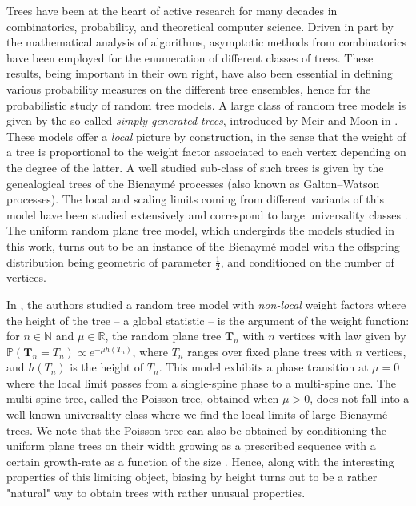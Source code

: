 \documentclass{article}
\newcommand{\pr}{\mathbb{P}}								%
\newcommand{\1}{\mathbbm{1}}								%
\theoremstyle{definition}
\numberwithin{equation}{section}
\newcommand{\bT}{\mathbf T}
\newcommand{\N}{\mathbb N}
\newcommand{\R}{\mathbb R}
\begin{document}
Trees have been at the heart of active research for many decades in combinatorics, probability, and theoretical computer science.  Driven in part by the mathematical analysis of algorithms, asymptotic methods from combinatorics have been employed for the enumeration of different classes of trees. These results, being important in their own right, have also been essential in defining various probability measures on the different tree ensembles, hence for the probabilistic study of random tree models. 
A large class of random tree models is given by the so-called \emph{simply generated trees}, introduced by Meir and Moon in \cite{meir1978altitude}. These models offer a \emph{local} picture by construction, in the sense that the weight of a tree is proportional to the weight factor associated to each vertex depending on the degree of the latter. A well studied sub-class of such trees is given by the genealogical trees of the Bienaym\'e processes (also known as Galton--Watson processes). The local and scaling limits coming from different variants of this model have been studied extensively and correspond to large universality classes \cite{abraham2015introduction,gall2011scaling}. The uniform random plane tree model, which undergirds the models studied in this work, turns out to be an instance of the Bienaymé model with the offspring distribution being geometric of parameter $\frac{1}{2}$, and conditioned on the number of vertices.

In \cite{durhuus2023trees},  the authors studied a random tree model with \emph{non-local} weight factors where the height of the tree -- a global statistic -- is the argument of the weight function: for $n \in \N$ and $\mu \in \R$, the random plane tree $\bT_n$ with $n$ vertices with law given by $\pr(\bT_n=T_n) \propto e^{-\mu h(T_n)}$, where $T_n$ ranges over fixed plane trees with $n$ vertices, and $h(T_n)$ is the height of $T_n$. This model exhibits a phase transition at $\mu=0$ where the local limit passes from a single-spine phase to a multi-spine one. The multi-spine tree, called the Poisson tree, obtained when $\mu>0$, does not fall into a well-known universality class where we find the local limits of large Bienaymé trees. We note that the Poisson tree can also be obtained by conditioning the uniform plane trees on their width growing as a prescribed sequence with a certain growth-rate as a function of the size \cite{abraham2020very}. Hence, along with the interesting properties of this limiting object, biasing by height turns out to be a rather "natural" way to obtain trees with rather unusual properties.
\end{document}
